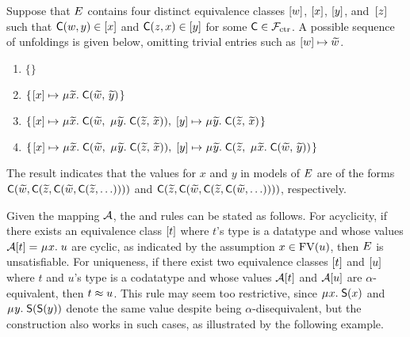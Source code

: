 \begin{examplex}
Suppose that $E$ contains four distinct equivalence classes $[w]$, $[x]$, $[y]$, and~$[z]$
such that $\textsf{C}(w,y) \in [x]$ and $\textsf{C}(z,x) \in [y]$ for some $\textsf{C} \in \mathcal{F}_{\mathrm{ctr}}$.
A possible sequence of unfoldings is given below, omitting
trivial entries such as $[w] \mapsto {\widetilde{w}}$.
%
\begin{enumerate}
\item \noindent{}$\{  \}$
\item \noindent{}$\{\vthinspace  \ec{x} \mapsto \MU {\Varec{x}}.\; \const{C}( {\Varec{w}},\, {\Varec{y}} ) \vthinspace\}$
\item \noindent{}$\{\vthinspace  \ec{x} \mapsto \MU {\Varec{x}}.\; \const{C}( {\Varec{w}},\; \MU {\Varec{y}}.\; \const{C}( {\Varec{z}},\, {\Varec{x}} ) ),\;
  \ec{y} \mapsto \MU {\Varec{y}}.\; \const{C}( {\Varec{z}},\, {\Varec{x}} ) \vthinspace\}$
\item \noindent{}$\{\vthinspace  \ec{x} \mapsto \MU {\Varec{x}}.\; \const{C}( {\Varec{w}},\; \MU {\Varec{y}}.\; \const{C}( {\Varec{z}},\, {\Varec{x}} ) ),\;
  \ec{y} \mapsto \MU {\Varec{y}}.\; \const{C}( {\Varec{z}},\; \MU {\Varec{x}}.\; \const{C}( {\Varec{w}},\, {\Varec{y}} ) ) \vthinspace\}$
\end{enumerate}
%
The result indicates that the values for $x$ and $y$ in models of $E$
are of the forms $\textsf{C}( {\widetilde{w}},\allowbreak \textsf{C}( {\widetilde{z}},\allowbreak \textsf{C}( {\widetilde{w}},\allowbreak \textsf{C}( {\widetilde{z}},\ldots ))))$
and $\textsf{C}( {\widetilde{z}}, \textsf{C}( {\widetilde{w}}, \textsf{C}( {\widetilde{z}}, \textsf{C}( {\widetilde{w}}, \ldots ))))$,
respectively. %
\xend
\end{examplex}

Given the mapping $\mathcal{A}$, the  and  rules can be stated as follows.
For acyclicity, if there exists an equivalence class $[t]$
where $t$'s type is a datatype and
whose %
values $\Val \ec{t} = \MU x.\; u$ are cyclic,
as indicated by the assumption $x \in \mathrm{FV}( u )$,
then $E$ is unsatisfiable.
For uniqueness, if there exist two equivalence classes $[t]$ and $[u]$
where $t$ and $u$'s type is a codatatype and
whose %
values $\mathcal{A} [t]$ and $\mathcal{A} [u]$ are $\alpha$-equivalent,
then $t \approx u$. This rule may seem too restrictive, since
$\MU x.\; \const{S}(x)$ and $\MU y.\; \const{S}(\const{S}(y))$ denote the same
value despite being $\alpha$-disequivalent, but the construction also works in
such cases, as illustrated by the following example.

